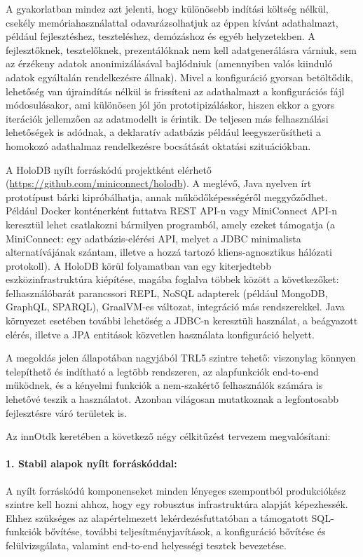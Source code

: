 \documentclass[12pt]{article}
\begin{document}
A gyakorlatban mindez azt jelenti, hogy különösebb indítási költség nélkül, csekély memóriahasználattal odavarázsolhatjuk az éppen kívánt adathalmazt, például fejlesztéshez, teszteléshez, demózáshoz és egyéb helyzetekben.
A fejlesztőknek, tesztelőknek, prezentálóknak nem kell adatgenerálásra várniuk, sem az érzékeny adatok anonimizálásával bajlódniuk (amennyiben valós kiinduló adatok egyáltalán rendelkezésre állnak).
Mivel a konfiguráció gyorsan betöltődik, lehetőség van újraindítás nélkül is frissíteni az adathalmazt a konfigurációs fájl módosulásakor, ami különösen jól jön prototipizáláskor, hiszen ekkor a gyors iterációk jellemzően az adatmodellt is érintik.
De teljesen más felhasználási lehetőségek is adódnak, a deklaratív adatbázis például leegyszerűsítheti a homokozó adathalmaz rendelkezésre bocsátását oktatási szituációkban.

A HoloDB nyílt forráskódú projektként elérhető ({\small \url{https://github.com/miniconnect/holodb}}).
A meglévő, Java nyelven írt prototípust bárki kipróbálhatja, annak működőképességéről meggyőződhet.
Például Docker konténerként futtatva REST API-n vagy MiniConnect API-n keresztül lehet csatlakozni bármilyen programból, amely ezeket támogatja
(a MiniConnect: egy adatbázis-elérési API, melyet a JDBC minimalista alternatívájának szántam, illetve a hozzá tartozó kliens-agnosztikus hálózati protokoll).
A HoloDB körül folyamatban van egy kiterjedtebb eszközinfrastruktúra kiépítése, magába foglalva többek között a következőket: felhasználóbarát parancssori REPL, NoSQL adapterek (például MongoDB, GraphQL, SPARQL), GraalVM-es változat, integráció más rendszerekkel.
Java környezet esetében további lehetőség a JDBC-n keresztüli használat,
a beágyazott elérés, illetve a JPA entitások közvetlen használata konfiguráció helyett.

A megoldás jelen állapotában nagyjából TRL5 szintre tehető:
viszonylag könnyen telepíthető és indítható a legtöbb rendszeren,
az alapfunkciók end-to-end működnek,
és a kényelmi funkciók a nem-szakértő felhasználók számára is lehetővé teszik a használatot.
Azonban világosan mutatkoznak a legfontosabb fejlesztésre váró területek is.

Az innOtdk keretében a következő négy célkitűzést tervezem megvalósítani:

\paragraph{1. Stabil alapok nyílt forráskóddal:}
A nyílt forráskódú komponenseket minden lényeges szempontból produkciókész szintre kell hozni ahhoz, hogy egy robusztus infrastruktúra alapját képezhessék.
Ehhez szükséges az alapértelmezett lekérdezésfuttatóban a támogatott SQL-funkciók bővítése,
további teljesítményjavítások,
a konfiguráció bővítése és felülvizsgálata,
valamint end-to-end helyességi tesztek bevezetése.
\end{document}
